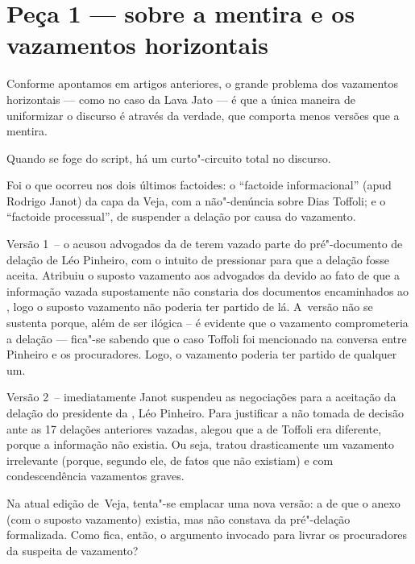  

\section{Peça 1 --- sobre a mentira e os vazamentos horizontais}

Conforme apontamos em artigos anteriores, o grande problema dos
vazamentos horizontais --- como no caso da Lava Jato --- é que a única
maneira de uniformizar o discurso é através da verdade, que comporta
menos versões que a mentira.

Quando se foge do script, há um curto"-circuito total no discurso.

Foi o que ocorreu nos dois últimos factoides: o ``factoide
informacional'' (apud Rodrigo Janot) da capa da Veja, com a não"-denúncia
sobre Dias Toffoli; e o ``factoide processual'', de suspender a delação
por causa do vazamento.

Versão 1~-- o  acusou advogados da  de terem vazado parte do
pré"-documento de delação de Léo Pinheiro, com o intuito de pressionar
para que a delação fosse aceita. Atribuiu o suposto vazamento aos
advogados da  devido ao fato de que a informação vazada supostamente
não constaria dos documentos encaminhados ao , logo o suposto
vazamento não poderia ter partido de lá. A~versão não se sustenta
porque, além de ser ilógica -- é evidente que o vazamento comprometeria
a delação --- fica"-se sabendo que o caso Toffoli foi mencionado na
conversa entre Pinheiro e os procuradores. Logo, o vazamento poderia ter
partido de qualquer um.

Versão 2~-- imediatamente Janot suspendeu as negociações para a
aceitação da delação do presidente da , Léo Pinheiro. Para justificar
a não tomada de decisão ante as 17 delações anteriores vazadas, alegou
que a de Toffoli era diferente, porque a informação não existia. Ou
seja, tratou drasticamente um vazamento irrelevante (porque, segundo
ele, de fatos que não existiam) e com condescendência vazamentos graves.

Na atual edição de~Veja, tenta"-se emplacar uma nova versão: a de que o
anexo (com o suposto vazamento) existia, mas não constava da pré"-delação
formalizada. Como fica, então, o argumento invocado para livrar os
procuradores da suspeita de vazamento?

 

